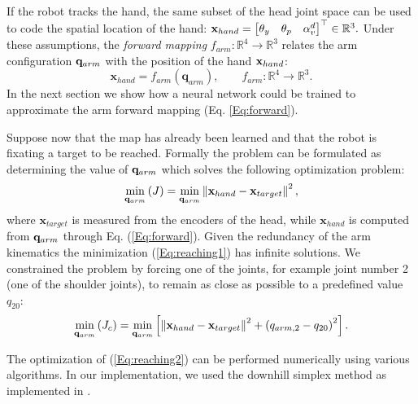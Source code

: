 If the robot tracks the hand, the same subset of the head joint space 
can be used to code the spatial location of the hand: $
\mathbf{x}_{hand}=
\begin{bmatrix} \theta_y & \theta_p & \alpha_v^d\end{bmatrix}^\top \in \mathbb R^3.
$
%
Under these assumptions, the \emph{forward mapping} 
$f_{arm} : \mathbb R^4 \longrightarrow \mathbb R^3$
relates the arm configuration $\mathbf q_{arm}$ with the position of the hand 
$\mathbf{x}_{hand}$:
%
\begin{equation} 
\label{Eq:forward}
\mathbf x_{hand}=f_{arm}(\mathbf q_{arm}), \qquad f_{arm} : \mathbb R^4 \longrightarrow \mathbb R^3.\end{equation}
%
In the next section we show how a neural network could be trained to approximate
the arm forward mapping (Eq. \ref{Eq:forward}).

Suppose now that the map has already been learned and that the robot is fixating a 
target to be reached. Formally the problem can be formulated 
as determining the value of $\mathbf q_{arm}$ which solves the 
following optimization problem:
%
\begin{equation} 
\label{Eq:reaching1}
  \displaystyle\min_{\mathbf q_{arm}} \left(J\right)=\displaystyle\min_{\mathbf q_{arm}}
  \left\|\mathbf x_{hand} - \mathbf x_{target}\right\|^2,
\end{equation}
%
where $\mathbf x_{target}$ is measured from the encoders of the head, while 
$\mathbf x_{hand}$ is computed from $\mathbf q_{arm}$ through Eq. (\ref{Eq:forward}).
Given the redundancy of the arm kinematics the minimization 
(\ref{Eq:reaching1}) has infinite solutions. We constrained the problem by 
forcing one of the joints, for example joint number 2 (one of the shoulder joints), to remain as close 
as possible to a predefined value $q_{20}$:
%
\begin{equation} 
\label{Eq:reaching2}
  \displaystyle\min_{\mathbf q_{arm}}\left(J_c\right)=\displaystyle\min_{\mathbf q_{arm}}
  \left[
  \left\|\mathbf x_{hand} - \mathbf x_{target}\right\|^2 + \left(q_{arm,2}-q_{20}\right)^2
  \right].
\end{equation}

The optimization of (\ref{Eq:reaching2}) can be performed numerically using 
various algorithms. In our implementation, we used 
the downhill simplex method \cite{ne:Computer:65} as implemented in 
\cite{mo:Press:90}.

